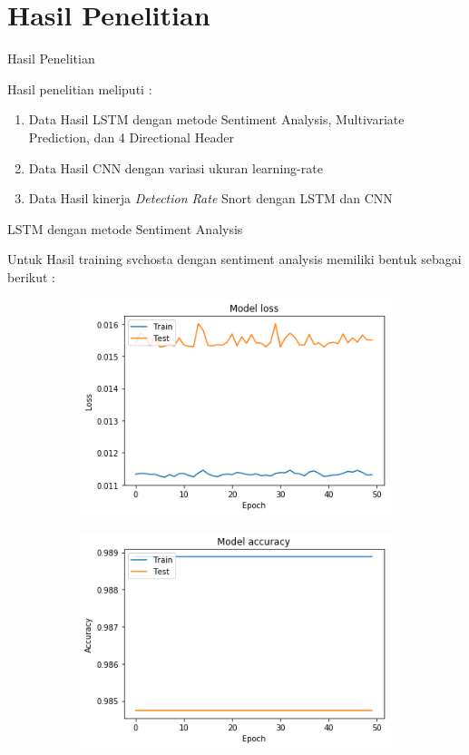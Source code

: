 \documentclass[t]{beamer}
\begin{document}
\section{Hasil Penelitian}
\begin{frame}{Hasil Penelitian}
	\par Hasil penelitian meliputi :
	\begin{enumerate}
		\item Data Hasil LSTM dengan metode Sentiment Analysis, Multivariate Prediction, dan 4 Directional Header
		\item Data Hasil CNN dengan variasi ukuran learning-rate
		\item Data Hasil kinerja \textit{Detection Rate} Snort dengan LSTM dan CNN
	\end{enumerate}
\end{frame}
\begin{frame}{LSTM dengan metode Sentiment Analysis}
	\par Untuk Hasil training svchosta dengan sentiment analysis memiliki bentuk sebagai berikut :
	\begin{figure}[H]
		\centering
		\begin{subfigure}[b]{.45\linewidth}
			\includegraphics[width=\textwidth]{public/assets/img/lstms_svchosta_loss.png}
		\end{subfigure}
		\begin{subfigure}[b]{.45\linewidth}
			\includegraphics[width=\textwidth] {public/assets/img/lstms_svchosta_acc.png}

\end{subfigure}
\end{figure}
\end{frame}
\end{document}
